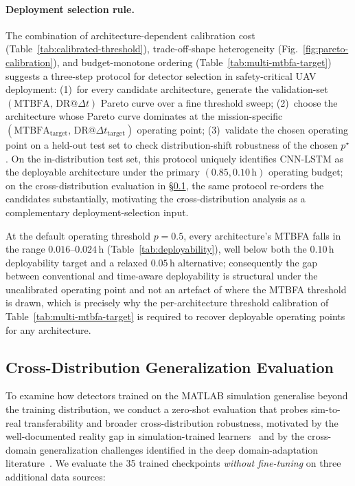 \documentclass{ieeeaccess}
\begin{document}
\paragraph{Deployment selection rule.}
The combination of architecture-dependent calibration cost
(Table~\ref{tab:calibrated-threshold}), trade-off-shape heterogeneity
(Fig.~\ref{fig:pareto-calibration}), and budget-monotone ordering
(Table~\ref{tab:multi-mtbfa-target}) suggests a three-step protocol
for detector selection in safety-critical UAV deployment:
(1)~for every candidate architecture, generate the validation-set
$(\text{MTBFA},\,\text{DR@}\Delta t)$ Pareto curve over a fine threshold sweep;
(2)~choose the architecture whose Pareto curve dominates at the
mission-specific $(\text{MTBFA}_{\text{target}},\,\text{DR@}\Delta t_{\text{target}})$
operating point;
(3)~validate the chosen operating point on a held-out test set to check
distribution-shift robustness of the chosen $p^\star$.
On the in-distribution test set, this protocol uniquely identifies CNN-LSTM
as the deployable architecture under the primary $(0.85, 0.10\,\text{h})$
operating budget; on the cross-distribution evaluation in
\S\ref{sec:cross_domain}, the same protocol re-orders the candidates
substantially, motivating the cross-distribution analysis as a complementary
deployment-selection input.

At the default operating threshold $p=0.5$, every architecture's
MTBFA falls in the range $0.016$--$0.024$\,h
(Table~\ref{tab:deployability}), well below both the $0.10$\,h
deployability target and a relaxed $0.05$\,h alternative; consequently
the gap between conventional and time-aware deployability is
structural under the uncalibrated operating point and not an
artefact of where the MTBFA threshold is drawn, which is precisely
why the per-architecture threshold calibration of
Table~\ref{tab:multi-mtbfa-target} is required to recover deployable
operating points for any architecture.

\subsection{Cross-Distribution Generalization Evaluation}
\label{sec:cross_domain}

To examine how detectors trained on the MATLAB simulation generalise
beyond the training distribution, we conduct a zero-shot evaluation that
probes sim-to-real transferability and broader cross-distribution
robustness, motivated by the well-documented reality gap in
simulation-trained learners~\cite{ref51} and by the cross-domain
generalization challenges identified in the deep domain-adaptation
literature~\cite{ref52}. We evaluate the 35 trained checkpoints
\emph{without fine-tuning} on three additional data sources:
\end{document}
